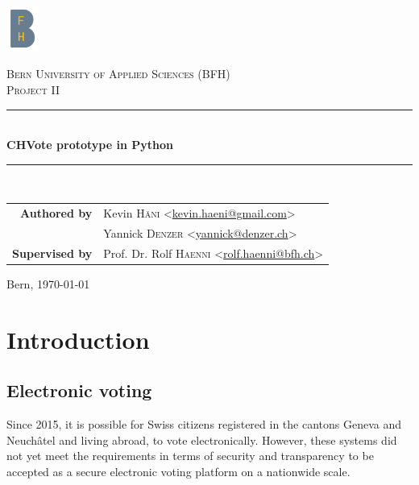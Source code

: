 \documentclass[a4paper,12pt]{report}
\begin{document}

\begin{titlepage}
\begin{center}
	\includegraphics[width=0.08\textwidth]{images/bfh_logo.png}

	\vspace{1cm}

	\textsc{\LARGE Bern University of Applied Sciences (BFH)} \\[1.5cm]
	\textsc{\Large Project II} \\[0.5cm]

	\newcommand{\HRule}{\rule{\linewidth}{0.3mm}}
	\HRule \\[0.4cm]
	{\huge \bfseries CHVote prototype in Python} \\[0.3cm]
	\HRule \\[1.5cm]

	\begin{tabular}{rl}
	\textbf{Authored by}
	& Kevin \textsc{Häni} <\href{mailto:kevin.haeni@gmail.com}{kevin.haeni@gmail.com}> \\
	& Yannick \textsc{Denzer} <\href{mailto:yannick@denzer.ch}{yannick@denzer.ch}> \\
	\textbf{Supervised by}
	& Prof. Dr. Rolf \textsc{Haenni} <\href{mailto:rolf.haenni@bfh.ch}{rolf.haenni@bfh.ch}> \\
	\end{tabular}

	\vspace{1.5cm}


	\vfill

	Bern, {\large \today}
\end{center}
\end{titlepage}

\clearpage
\tableofcontents


\clearpage
\chapter{Introduction}
\section{Electronic voting}
Since 2015, it is possible for Swiss citizens registered in the cantons Geneva and Neuchâtel and living abroad, to vote electronically. However, these systems did not yet meet the requirements in terms of security and transparency to be accepted as a secure electronic voting platform on a nationwide scale.
\end{document}
